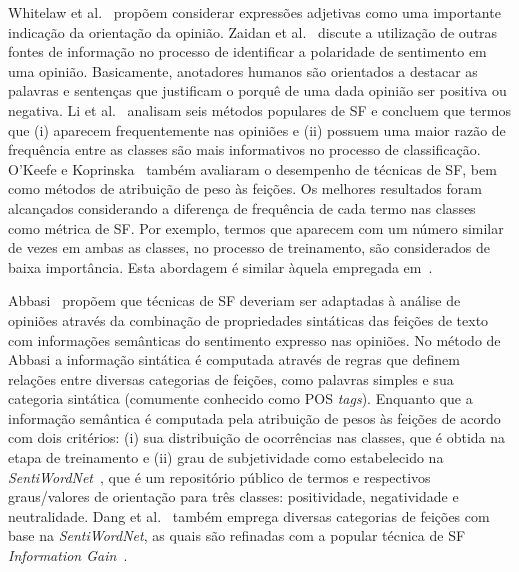 \documentclass[11pt,a4paper]{article}
\begin{document}
 Whitelaw et al.~\cite{Whitelaw:Appraisal} propõem considerar expressões adjetivas como uma importante indicação da orientação da opinião. Zaidan et al.~\cite{Zaidan:Rationales} discute a utilização de outras fontes de informação no processo de identificar a polaridade de sentimento em uma opinião. Basicamente, anotadores humanos são orientados a destacar as palavras e sentenças que justificam o porquê de uma dada opinião ser positiva ou negativa. Li et al.~\cite{Li:Framework} analisam seis métodos populares de SF e concluem que termos que (i) aparecem frequentemente nas opiniões e (ii) possuem uma maior razão de frequência entre as classes são mais informativos no processo de classificação. O'Keefe e Koprinska~\cite{OKeefe:Weighting} também avaliaram o desempenho de técnicas de SF, bem como métodos de atribuição de peso às feições. Os melhores resultados foram alcançados considerando a diferença de frequência de cada termo nas classes como métrica de SF. Por exemplo, termos que aparecem com um número similar de vezes em ambas as classes, no processo de treinamento, são considerados de baixa importância. Esta abordagem é similar àquela empregada em~\cite{Li:Framework}.

 Abbasi~\cite{abbasi:IFS} propõem que técnicas de SF deveriam ser adaptadas à análise de opiniões através da combinação de propriedades sintáticas das feições de texto com informações semânticas do sentimento expresso nas opiniões. No método de Abbasi a informação sintática é computada através de regras que definem relações entre diversas categorias de feições, como palavras simples e sua categoria sintática (comumente conhecido como POS \textit{tags}). Enquanto que a informação semântica é computada pela atribuição de pesos às feições de acordo com dois critérios: (i) sua distribuição de ocorrências nas classes, que é obtida na etapa de treinamento e (ii) grau de subjetividade como estabelecido na \textit{SentiWordNet}~\cite{Baccianella:Sentiwordnet3}, que é um repositório público de termos e respectivos graus/valores de orientação para três classes: positividade, negatividade e neutralidade. Dang et al.~\cite{Dang:Lexicon} também emprega diversas categorias de feições com base na \textit{SentiWordNet}, as quais são refinadas com a popular técnica de SF \textit{Information Gain}~\cite{Yang:comparative}.
\end{document}
